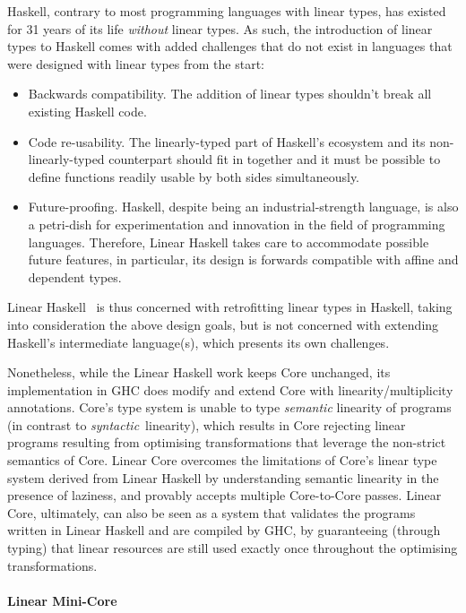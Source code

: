 \documentclass[acmsmall,review]{acmart}
\begin{document}
Haskell, contrary to most programming languages with linear types, has existed
for 31 years of its life \emph{without} linear types. As such, the introduction
of linear types to Haskell comes with added challenges that do not exist in
languages that were designed with linear types from the start:
%
\begin{itemize}
    \item Backwards compatibility. The addition of linear types shouldn't break
        all existing Haskell code.
    \item Code re-usability. The linearly-typed part of Haskell's ecosystem and
        its non-linearly-typed counterpart should fit in together and it must be
        possible to define functions readily usable by both sides
        simultaneously.
    \item Future-proofing. Haskell, despite being an
        industrial-strength language, is also a petri-dish for experimentation
        and innovation in the field of programming languages. Therefore, Linear
        Haskell takes care to accommodate possible future features, in
        particular, its design is forwards compatible with affine and dependent
        types.
\end{itemize}
%
Linear Haskell~\cite{cite:linearhaskell} is thus concerned with retrofitting
linear types in Haskell, taking into consideration the above design goals, but
is not concerned with extending Haskell's intermediate language(s),
which presents its own challenges. 

Nonetheless, while the Linear Haskell work keeps Core unchanged, its
implementation in GHC does modify and extend Core with linearity/multiplicity
annotations. Core's type system is unable to type \emph{semantic} linearity of
programs (in contrast to \emph{syntactic} linearity), which results in Core
rejecting linear programs resulting from optimising transformations that
leverage the non-strict semantics of Core.
%
Linear Core overcomes the limitations of Core's linear type system derived from
Linear Haskell by understanding semantic linearity in the presence of laziness,
and provably accepts multiple Core-to-Core passes. Linear Core, ultimately, can
also be seen as a system that validates the programs written in Linear Haskell
and are compiled by GHC, by guaranteeing (through typing) that linear resources
are still used exactly once throughout the optimising transformations.

\paragraph{Linear Mini-Core\label{sec:linear-mini-core}}
\end{document}
